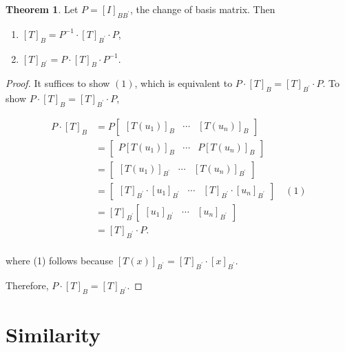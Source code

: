 \documentclass[12pt]{article}
\theoremstyle{definition}
\newtheorem{theorem}{Theorem}[section]  %
\begin{document}
\begin{theorem}
Let $P = [I]_{BB^{\prime}}$, the change of basis matrix. Then

\begin{enumerate}[label = (\arabic*)]
\item $[T]_B = P^{-1} \cdot [T]_{B^{\prime}} \cdot P$,
\item $[T]_{B^{\prime}} = P \cdot [T]_B \cdot P^{-1}$.
\end{enumerate}
\end{theorem}

\begin{proof}
It suffices to show $(1)$, which is equivalent to $P \cdot [T]_B = [T]_{B^{\prime}} \cdot P$.
To show $P \cdot [T]_B = [T]_{B^{\prime}} \cdot P$,

\begin{align*}
P \cdot [T]_B &= P \begin{bmatrix} [T(u_1)]_B & \cdots & [T(u_n)]_B \end{bmatrix} \\
&= \begin{bmatrix} P[T(u_1)]_B & \cdots & P[T(u_n)]_B \end{bmatrix} \\
&= \begin{bmatrix} [T(u_1)]_{B^{\prime}} & \cdots & [T(u_n)]_{B^{\prime}} \end{bmatrix} \\
&= \begin{bmatrix} [T]_{B^{\prime}} \cdot [u_1]_{B^{\prime}} & \cdots & [T]_{B^{\prime}} \cdot
[u_n]_{B^{\prime}} \end{bmatrix} \quad (1) \\
&= [T]_{B^{\prime}} \begin{bmatrix} [u_1]_{B^{\prime}} & \cdots & [u_n]_{B^{\prime}}
\end{bmatrix} \\
&= [T]_{B^{\prime}} \cdot P. \\
\end{align*}

where (1) follows because $[T(x)]_{B^{\prime}} = [T]_{B^{\prime}} \cdot [x]_{B^{\prime}}$.

Therefore, $P \cdot [T]_B = [T]_{B^{\prime}}$.
\end{proof}

\section{Similarity}
\end{document}
